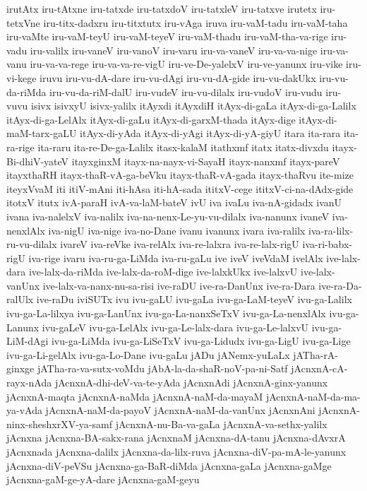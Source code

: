 {irutAtx
iru-tAtxne
iru-tatxde
iru-tatxdoV
iru-tatxleV
iru-tatxve
irutetx
iru-tetxVne
iru-titx-dadxru
iru-titxtutx
iru-vAga
iruva
iru-vaM-tadu
iru-vaM-taha
iru-vaMte
iru-vaM-teyU
iru-vaM-teyeV
iru-vaM-thadu
iru-vaM-tha-va-rige
iru-vadu
iru-valilx
iru-vaneV
iru-vanoV
iru-varu
iru-va-vaneV
iru-va-va-nige
iru-va-vanu
iru-va-va-rege
iru-va-va-re-vigU
iru-ve-De-yalelxV
iru-ve-yanunx
iru-vike
iru-vi-kege
iruvu
iru-vu-dA-dare
iru-vu-dAgi
iru-vu-dA-gide
iru-vu-dakUkx
iru-vu-da-riMda
iru-vu-da-riM-dalU
iru-vudeV
iru-vu-dilalx
iru-vudoV
iru-vudu
iru-vuvu
isivx
isivxyU
isivx-yalilx
itAyxdi
itAyxdiH
itAyx-di-gaLa
itAyx-di-ga-Lalilx
itAyx-di-ga-LelAlx
itAyx-di-gaLu
itAyx-di-garxM-thada
itAyx-dige
itAyx-di-maM-tarx-gaLU
itAyx-di-yAda
itAyx-di-yAgi
itAyx-di-yA-giyU
itara
ita-rara
ita-ra-rige
ita-raru
ita-re-De-ga-Lalilx
itasx-kalaM
itathxmf
itatx
itatx-divxdu
itayx-Bi-dhiV-yateV
itayxginxM
itayx-na-nayx-vi-SayaH
itayx-nanxmf
itayx-pareV
itayxthaRH
itayx-thaR-vA-ga-beVku
itayx-thaR-vA-gada
itayx-thaRvu
ite-mize
iteyxVvaM
iti
itiV-mAni
iti-hAsa
iti-hA-sada
ititxV-cege
ititxV-ci-na-dAdx-gide
itotxV
itutx
ivA-paraH
ivA-va-laM-bateV
ivU
iva
ivaLu
iva-nA-gidadx
ivanU
ivana
iva-nalelxV
iva-nalilx
iva-na-nenx-Le-yu-vu-dilalx
iva-nanunx
ivaneV
iva-nenxlAlx
iva-nigU
iva-nige
iva-no-Dane
ivanu
ivanunx
ivara
iva-ralilx
iva-ra-lilx-ru-vu-dilalx
ivareV
iva-reVke
iva-relAlx
iva-re-lalxra
iva-re-lalx-rigU
iva-ri-babx-rigU
iva-rige
ivaru
iva-ru-ga-LiMda
iva-ru-gaLu
ive
iveV
iveVdaM
ivelAlx
ive-lalx-dara
ive-lalx-da-riMda
ive-lalx-da-roM-dige
ive-lalxkUkx
ive-lalxvU
ive-lalx-vanUnx
ive-lalx-va-nanx-nu-sa-risi
ive-raDU
ive-ra-DanUnx
ive-ra-Dara
ive-ra-Da-ralUlx
ive-raDu
iviSUTx
ivu
ivu-gaLU
ivu-gaLa
ivu-ga-LaM-teyeV
ivu-ga-Lalilx
ivu-ga-La-lilxya
ivu-ga-LanUnx
ivu-ga-La-nanxSeTxV
ivu-ga-La-nenxlAlx
ivu-ga-Lanunx
ivu-gaLeV
ivu-ga-LelAlx
ivu-ga-Le-lalx-dara
ivu-ga-Le-lalxvU
ivu-ga-LiM-dAgi
ivu-ga-LiMda
ivu-ga-LiSeTxV
ivu-ga-Lidudx
ivu-ga-LigU
ivu-ga-Lige
ivu-ga-Li-gelAlx
ivu-ga-Lo-Dane
ivu-gaLu
jADu
jANemx-yuLaLx
jATha-rA-ginxge
jATha-ra-va-sutx-voMdu
jAbA-la-da-shaR-noV-pa-ni-Satf
jAcnxnA-cA-rayx-nAda
jAcnxnA-dhi-deV-va-te-yAda
jAcnxnAdi
jAcnxnA-ginx-yanunx
jAcnxnA-maqta
jAcnxnA-naMda
jAcnxnA-naM-da-mayaM
jAcnxnA-naM-da-ma-ya-vAda
jAcnxnA-naM-da-payoV
jAcnxnA-naM-da-vanUnx
jAcnxnAni
jAcnxnA-ninx-sheshxrXV-ya-samf
jAcnxnA-nu-Ba-va-gaLa
jAcnxnA-va-sethx-yalilx
jAcnxna
jAcnxna-BA-sakx-rana
jAcnxnaM
jAcnxna-dA-tanu
jAcnxna-dAvxrA
jAcnxnada
jAcnxna-dalilx
jAcnxna-da-lilx-ruva
jAcnxna-diV-pa-mA-le-yanunx
jAcnxna-diV-peVSu
jAcnxna-ga-BaR-diMda
jAcnxna-gaLa
jAcnxna-gaMge
jAcnxna-gaM-ge-yA-dare
jAcnxna-gaM-geyu
}
